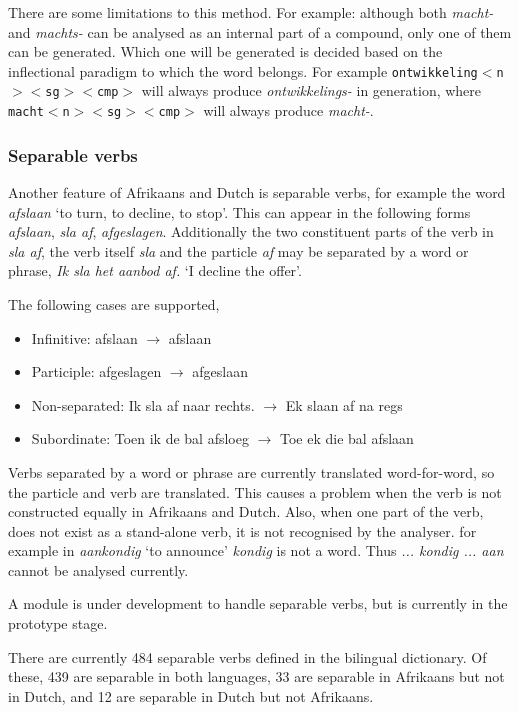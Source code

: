 \documentclass[11pt]{article}
\begin{document}
There are some limitations to this method. For example: although
both {\em macht-} and {\em machts-} can be analysed as an internal part
of a compound, only one of them can be generated. Which one will be generated
is decided based on the inflectional paradigm to which the word belongs. For
example {\small {\tt ontwikkeling$<$n$><$sg$><$cmp$>$}} will always produce {\em ontwikkelings-} in generation,
where {\small {\tt macht$<$n$><$sg$><$cmp$>$}} will always produce {\em macht-}.

\subsubsection{Separable verbs}

Another feature of Afrikaans and Dutch is separable verbs, for example
the word {\em afslaan} `to turn, to decline, to stop'. This can appear in the following
forms {\em afslaan}, {\em sla af}, {\em afgeslagen}. Additionally the two constituent
parts of the verb in {\em sla af}, the verb itself {\em sla} and the particle
{\em af} may be separated by a word or phrase, {\em Ik sla het aanbod af.}
 `I decline the offer'.

The following cases are supported,

\begin{itemize}
\item Infinitive: afslaan $\rightarrow$ afslaan 
\item Participle: afgeslagen $\rightarrow$ afgeslaan
\item Non-separated: Ik sla af naar rechts. $\rightarrow$ Ek slaan af na regs
\item Subordinate: Toen ik de bal afsloeg $\rightarrow$ Toe ek die bal afslaan
\end{itemize}

Verbs separated by a word or phrase are currently translated word-for-word,
so the particle and verb are translated. This causes a problem when the
verb is not constructed equally in Afrikaans and Dutch. Also, when one part
of the verb, does not exist as a stand-alone verb, it is not recognised by the analyser.
for example in {\em aankondig} `to announce' {\em kondig} is not a word. Thus {\em ... kondig ... aan} 
cannot be analysed currently.

A module is under development to handle separable verbs, but is currently
in the prototype stage.

There are currently 484 separable verbs defined in the bilingual
dictionary. Of these, 439 are separable in both languages, 33 are
separable in Afrikaans but not in Dutch, and 12 are separable in
Dutch but not Afrikaans.
\end{document}
